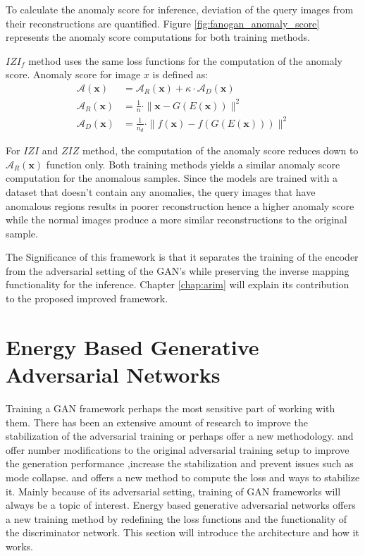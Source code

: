 To calculate the anomaly score for inference, deviation of the query images from their
reconstructions are quantified. Figure \ref{fig:fanogan_anomaly_score} represents the anomaly score
computations for both training methods.

 $IZI_f$ method uses the same loss functions for the computation of the anomaly score. Anomaly score
 for image $x$ is defined as:
\begin{align}
	\mathcal{A}(\mathbf{x})&=\mathcal{A}_{R}(\mathbf{x})+\kappa \cdot \mathcal{A}_{D}(\mathbf{x}) \\[5pt]
	\mathcal{A}_{R}(\mathbf{x})&=\frac{1}{n} \cdot\|\mathbf{x}-G(E(\mathbf{x}))\|^{2} \\[5pt]
	\mathcal{A}_{D}(\mathbf{x})&=\frac{1}{n_{d}} \cdot\|f(\mathbf{x})-f(G(E(\mathbf{x})))\|^{2}
\end{align}

For $IZI$ and $ZIZ$ method, the computation of the anomaly score reduces down to
$\mathcal{A}_{R}(\mathbf{x})$ function only. Both training methods yields a similar anomaly score
computation for the anomalous samples. Since the models are trained with a dataset that doesn't
contain any anomalies, the query images that have anomalous regions results in poorer reconstruction
hence a higher anomaly score while the normal images produce a more similar reconstructions to the
original sample. 

The Significance of this framework is that it separates the training of the encoder from the
adversarial setting of the GAN's while preserving the inverse mapping functionality for the
inference. Chapter \ref{chap:arim} will explain its contribution to the proposed improved framework.

\section{Energy Based Generative Adversarial Networks}
\label{sec:ebgan}

Training a GAN framework perhaps the most sensitive part of working with them. There has been an
extensive amount of research to improve the stabilization of the adversarial training or perhaps
offer a new methodology. \cite{fm} and \cite{methods} offer number modifications to the original
adversarial training setup to improve the generation performance ,increase the stabilization and
prevent issues such as mode collapse\footnotemark. \cite{Arjovsky2017WassersteinG} and
\cite{Gulrajani2017ImprovedTO} offers a new method to compute the loss and ways to stabilize it.
Mainly because of its adversarial setting, training of GAN frameworks will always be a topic of
interest. Energy based generative adversarial networks \cite{Zhao2016EnergybasedGA} offers a new
training method by redefining the loss functions and the functionality of the discriminator network.
This section will introduce the architecture and how it works.

